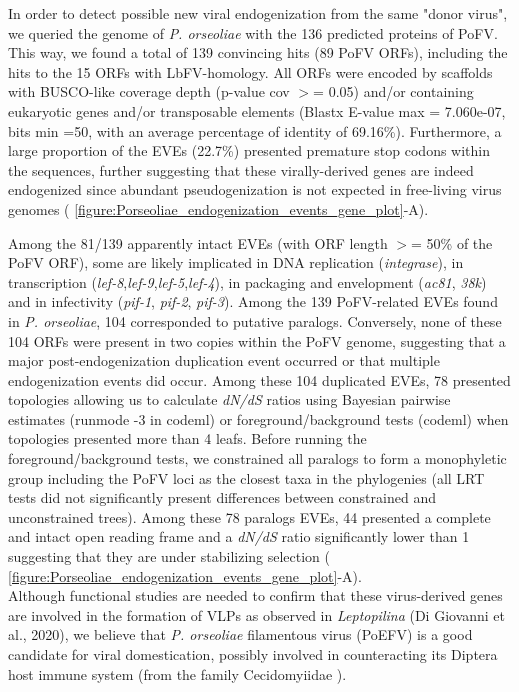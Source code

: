 In order to detect possible new viral endogenization from the same "donor virus", we queried the genome of \textit{P. orseoliae} with the 136 predicted proteins of PoFV. This way, we found a total of 139 convincing hits (89 PoFV ORFs), including the hits to the 15 ORFs with LbFV-homology. All ORFs were encoded by scaffolds with BUSCO-like coverage depth (p-value cov $>$= 0.05) and/or containing eukaryotic genes and/or transposable elements (Blastx E-value max = 7.060e-07, bits min =50, with an average percentage of identity of 69.16\%). Furthermore, a large proportion of the EVEs (22.7\%) presented premature stop codons within the sequences, further suggesting that these virally-derived genes are indeed endogenized since abundant pseudogenization is not expected in free-living virus genomes (\figurename{ \ref{figure:Porseoliae_endogenization_events_gene_plot}}-A).

Among the 81/139 apparently intact EVEs (with ORF length $>$= 50\% of the PoFV ORF), some are likely implicated in DNA replication (\textit{integrase}), in transcription (\textit{lef-8},\textit{lef-9},\textit{lef-5},\textit{lef-4}), in packaging and envelopment (\textit{ac81}, \textit{38k}) and in infectivity (\textit{pif-1}, \textit{pif-2}, \textit{pif-3}). Among the 139 PoFV-related EVEs found in \textit{P. orseoliae}, 104 corresponded to putative paralogs. Conversely, none of these 104 ORFs were present in two copies within the PoFV genome, suggesting that a major post-endogenization duplication event occurred or that multiple endogenization events did occur. Among these 104 duplicated EVEs, 78 presented topologies allowing us to calculate \textit{dN/dS} ratios using Bayesian pairwise estimates (runmode -3 in codeml) or foreground/background tests (codeml) when topologies presented more than 4 leafs. Before running the foreground/background tests, we constrained all paralogs to form a monophyletic group including the PoFV loci as the closest taxa in the phylogenies (all LRT tests did not significantly present differences between constrained and unconstrained trees). 
Among these 78 paralogs EVEs, 44 presented a complete and intact open reading frame and a \textit{dN/dS} ratio significantly lower than 1 suggesting that they are under stabilizing selection (\figurename{ \ref{figure:Porseoliae_endogenization_events_gene_plot}}-A). \\

Although functional studies are needed to confirm that these virus-derived genes are involved in the formation of VLPs as observed in \textit{Leptopilina} (Di Giovanni et al., 2020), we believe that \textit{P. orseoliae} filamentous virus (PoEFV) is a good candidate for viral domestication, possibly involved in counteracting its Diptera host immune system (from the family Cecidomyiidae \citep{buhl_new_2016}).\\

